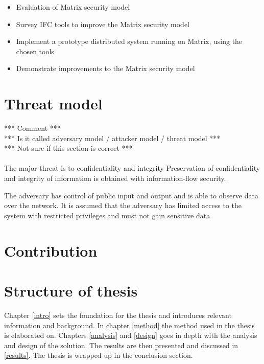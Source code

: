 \begin{itemize}
\item Evaluation of Matrix security model
\item Survey IFC tools to improve the Matrix security model
\item Implement a prototype distributed system running on Matrix, using the chosen tools
\item Demonstrate improvements to the Matrix security model
\end{itemize}   
 
 
 \section{Threat model}
 
 *** Comment *** 
 \\
 *** Is it called adversary model / attacker model / threat model ***
 \\
 *** Not sure if this section is correct ***
 \\
 \\
 The major threat is to confidentiality and integrity
 Preservation of confidentiality and integrity of information is obtained with information-flow security. 
 
 
 The adversary has control of public input and output and is able to observe data over the network. It is assumed that the adversary has limited access to the system with restricted privileges and must not gain sensitive data.
 
 
 
\section{Contribution} %
 
\section{Structure of thesis} %

Chapter \ref{intro} sets the foundation for the thesis and introduces relevant information and background. In chapter \ref{method} the method used in the thesis is elaborated on. Chapters \ref{analysis} and \ref{design} goes in depth with the analysis and design of the solution. The results are then presented and discussed in \ref{results}. The thesis is wrapped up in the conclusion section. 
 